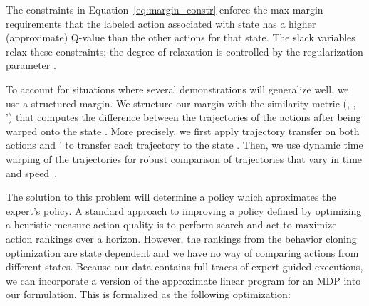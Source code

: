 The constraints in Equation~\ref{eq:margin_constr}
enforce the max-margin requirements that the
labeled action  associated with state 
has a higher (approximate) Q-value than the other actions for that
state. The slack variables  relax these constraints;
the degree of relaxation is controlled by the regularization parameter \marginslackc{}.


To account for situations where several demonstrations will generalize well, we use a structured margin.
We structure our margin with the similarity metric
\marginvar{}(, , \actionvar{}') that computes
the difference between the trajectories of the actions after being warped onto
the state . More precisely, we first apply trajectory
transfer on both actions  and \actionvar{}' to transfer
each trajectory to the state . Then, we use dynamic
time warping of the trajectories for robust comparison of trajectories that
vary in time and speed~\cite{Sakoe_IEEE1978, Vakanski_2012}.

The solution to this problem will determine a policy which aproximates the expert's policy.
A standard approach to improving a policy defined by optimizing a heuristic measure action quality
is to perform search and act to maximize action rankings over a horizon. 
However, the rankings from the behavior cloning optimization are state dependent and 
we have no way of comparing actions from different states. Because our data
contains full traces of expert-guided executions, we can incorporate a version
of the approximate linear program for an MDP into our formulation. This is formalized as the 
following optimization:

